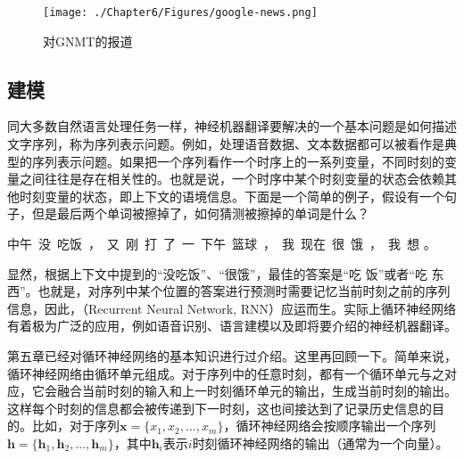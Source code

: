 \begin{figure}[htp]
\centering
\texttt{[image: ./Chapter6/Figures/google-news.png]}
\caption{对GNMT的报道}
\label{fig:6-8}
\end{figure}

\subsection{建模}
\label{sec:6.3.1}
\vspace{0.5em}

\parinterval 同大多数自然语言处理任务一样，神经机器翻译要解决的一个基本问题是如何描述文字序列，称为序列表示问题。例如，处理语音数据、文本数据都可以被看作是典型的序列表示问题。如果把一个序列看作一个时序上的一系列变量，不同时刻的变量之间往往是存在相关性的。也就是说，一个时序中某个时刻变量的状态会依赖其他时刻变量的状态，即上下文的语境信息。下面是一个简单的例子，假设有一个句子，但是最后两个单词被擦掉了，如何猜测被擦掉的单词是什么？

\vspace{0.8em}
\centerline{中午\ 没\ 吃饭\ ，\ 又\ 刚\ 打\ 了\ 一\ 下午\ 篮球\ ，\ 我\ 现在\ 很\ 饿\ ，\ 我\ 想\underline{\quad \quad \quad} 。}
\vspace{0.8em}

\parinterval 显然，根据上下文中提到的``没吃饭''、``很饿''，最佳的答案是``吃 饭''或者``吃 东西''。也就是，对序列中某个位置的答案进行预测时需要记忆当前时刻之前的序列信息，因此，{\small{}}（Recurrent Neural Network, RNN）应运而生。实际上循环神经网络有着极为广泛的应用，例如语音识别、语言建模以及即将要介绍的神经机器翻译。

\parinterval 第五章已经对循环神经网络的基本知识进行过介绍。这里再回顾一下。简单来说，循环神经网络由循环单元组成。对于序列中的任意时刻，都有一个循环单元与之对应，它会融合当前时刻的输入和上一时刻循环单元的输出，生成当前时刻的输出。这样每个时刻的信息都会被传递到下一时刻，这也间接达到了记录历史信息的目的。比如，对于序列$\mathbf{x}=\{x_1, x_2,..., x_m\}$，循环神经网络会按顺序输出一个序列$\mathbf{h}=\{ \mathbf{h}_1, \mathbf{h}_2,..., \mathbf{h}_m \}$，其中$\mathbf{h}_i$表示$i$时刻循环神经网络的输出（通常为一个向量）。

